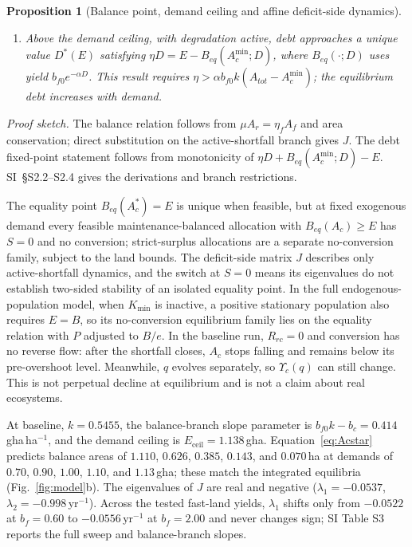 \documentclass[preprint,12pt,authoryear]{elsarticle}
\newtheorem{proposition}{Proposition}
\newcommand{\Ups}{\Upsilon_c}
\newcommand{\Eceil}{E_{\mathrm{ceil}}}
\newcommand{\Acmin}{A_c^{\min}}
\begin{document}
\begin{proposition}[Balance point, demand ceiling and affine deficit-side dynamics]
\begin{enumerate}[label=(\roman*)]
\item Above the demand ceiling, with degradation active, debt approaches a unique value $D^*(E)$ satisfying $\eta D=E-B_{eq}(\Acmin;D)$, where $B_{eq}(\cdot;D)$ uses yield $b_{f0}e^{-\alpha D}$. This result requires $\eta>\alpha b_{f0}k(A_{tot}-\Acmin)$; the equilibrium debt increases with demand.
\end{enumerate}
\end{proposition}

\noindent\emph{Proof sketch.} The balance relation follows from $\mu A_r=\eta_fA_f$ and area conservation; direct substitution on the active-shortfall branch gives $J$. The debt fixed-point statement follows from monotonicity of $\eta D+B_{eq}(\Acmin;D)-E$. SI~\S S2.2--S2.4 gives the derivations and branch restrictions.

The equality point $B_{eq}(A_c^*)=E$ is unique when feasible, but at fixed exogenous demand every feasible maintenance-balanced allocation with $B_{eq}(A_c)\ge E$ has $S=0$ and no conversion; strict-surplus allocations are a separate no-conversion family, subject to the land bounds. The deficit-side matrix $J$ describes only active-shortfall dynamics, and the switch at $S=0$ means its eigenvalues do not establish two-sided stability of an isolated equality point. In the full endogenous-population model, when $K_{\min}$ is inactive, a positive stationary population also requires $E=B$, so its no-conversion equilibrium family lies on the equality relation with $P$ adjusted to $B/e$. In the baseline run, $R_{rc}=0$ and conversion has no reverse flow: after the shortfall closes, $A_c$ stops falling and remains below its pre-overshoot level. Meanwhile, $q$ evolves separately, so $\Ups(q)$ can still change. This is not perpetual decline at equilibrium and is not a claim about real ecosystems.

At baseline, $k=0.5455$, the balance-branch slope parameter is $b_{f0}k-b_c=0.414$\,gha\,ha$^{-1}$, and the demand ceiling is $\Eceil=1.138$\,gha. Equation~\eqref{eq:Acstar} predicts balance areas of $1.110$, $0.626$, $0.385$, $0.143$, and $0.070$\,ha at demands of $0.70$, $0.90$, $1.00$, $1.10$, and $1.13$\,gha; these match the integrated equilibria (Fig.~\ref{fig:model}b). The eigenvalues of $J$ are real and negative ($\lambda_1=-0.0537$, $\lambda_2=-0.998$\,yr$^{-1}$). Across the tested fast-land yields, $\lambda_1$ shifts only from $-0.0522$ at $b_f=0.60$ to $-0.0556$\,yr$^{-1}$ at $b_f=2.00$ and never changes sign; SI Table S3 reports the full sweep and balance-branch slopes.
\end{document}
